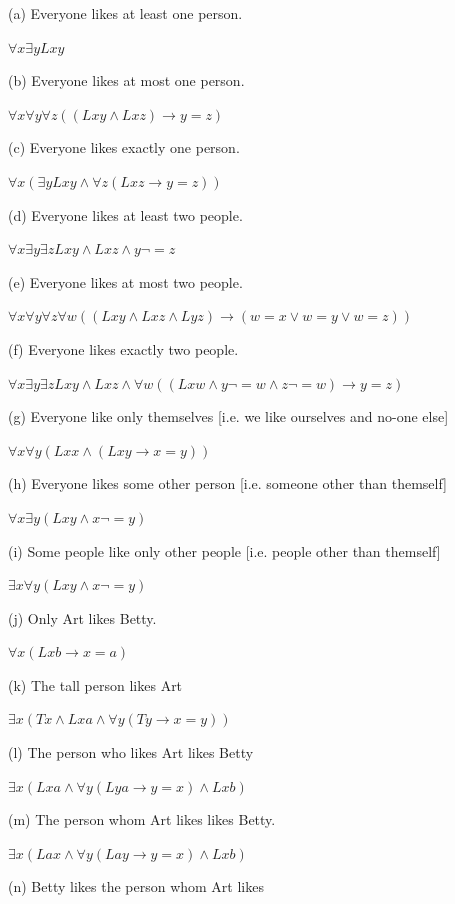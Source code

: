 \documentclass[12pt]{article}
\begin{document}
(a) Everyone likes at least one person. 

$\forall x \exists y Lxy$

(b) Everyone likes at most one person. 

$\forall x \forall y \forall z ((Lxy \land Lxz) \rightarrow y = z)$

(c) Everyone likes exactly one person. 

$\forall x (\exists y Lxy \land \forall z (Lxz \rightarrow y = z))$

(d) Everyone likes at least two people. 

$\forall x \exists y \exists z Lxy \land Lxz \land y \lnot = z$

(e) Everyone likes at most two people. 

$\forall x \forall y \forall z \forall w ((Lxy \land Lxz \land Lyz) \rightarrow (w = x \lor w = y \lor w = z))$

(f) Everyone likes exactly two people. 

$\forall x \exists y \exists z Lxy \land Lxz \land \forall w ((Lxw \land y \lnot = w \land z \lnot = w) \rightarrow y = z)$

(g) Everyone like only themselves [i.e. we like ourselves and no-one else] 

$\forall x \forall y (Lxx \land (Lxy \rightarrow x = y))$

(h) Everyone likes some other person [i.e. someone other than themself] 

$\forall x \exists y (Lxy \land x \lnot = y)$

(i) Some people like only other people [i.e. people other than themself] 

$\exists x \forall y (Lxy \land x \lnot = y)$

(j) Only Art likes Betty. 

$\forall x (Lxb \rightarrow x = a)$

(k) The tall person likes Art 

$\exists x (Tx \land Lxa \land \forall y ( Ty \rightarrow x = y) )$

(l) The person who likes Art likes Betty 

$\exists x (Lxa \land \forall y (Lya \rightarrow y = x) \land Lxb)$

(m) The person whom Art likes likes Betty. 

$\exists x (Lax \land \forall y (Lay \rightarrow y = x) \land Lxb)$

(n) Betty likes the person whom Art likes 
\end{document}
